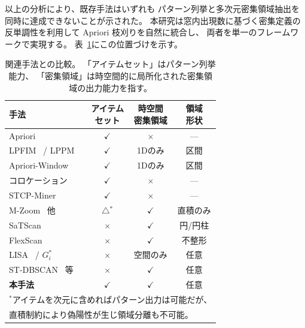 以上の分析により、既存手法はいずれも
パターン列挙と多次元密集領域抽出を同時に達成できないことが示された。
本研究は窓内出現数に基づく密集定義の反単調性を利用して
Apriori 枝刈りを自然に統合し、
両者を単一のフレームワークで実現する。
表~\ref{tab:related}にこの位置づけを示す。

\begin{table}[t]
\centering
\caption{関連手法との比較。
「アイテムセット」はパターン列挙能力、
「密集領域」は時空間的に局所化された密集領域の出力能力を指す。}
\label{tab:related}
\small
\begin{tabular}{lccc}
\toprule
手法 & \shortstack{アイテム\\セット} & \shortstack{時空間\\密集領域} & \shortstack{領域\\形状} \\
\midrule
Apriori~\cite{agrawal1994apriori}
                                          & $\checkmark$ & $\times$     & ---          \\
LPFIM~\cite{mahanta2005lpfim} / LPPM~\cite{fournierviger2021lppm}
                                          & $\checkmark$ & 1Dのみ      & 区間     \\
Apriori-Window~\cite{aprioriwindow}       & $\checkmark$ & 1Dのみ      & 区間     \\
コロケーション~\cite{shekhar2001colocation}
                                          & $\checkmark$ & $\times$     & ---          \\
STCP-Miner~\cite{qian2009stcolocation}   & $\checkmark$ & $\times$     & ---          \\
\midrule
M-Zoom~\cite{shin2018mzoom} 他           & $\triangle$$^*$     & $\checkmark$ & 直積のみ \\
SaTScan~\cite{kulldorff1997spatial}       & $\times$     & $\checkmark$ & 円/円柱 \\
FlexScan~\cite{tango2005flexscan}        & $\times$     & $\checkmark$ & 不整形    \\
LISA~\cite{anselin1995lisa}
  / $G_i^*$~\cite{ord1995getis}          & $\times$     & 空間のみ     & 任意         \\
ST-DBSCAN~\cite{birant2007stdbscan} 等   & $\times$   & $\checkmark$ & 任意    \\
\midrule
\textbf{本手法}                              & $\checkmark$ & $\checkmark$ & 任意    \\
\bottomrule
\multicolumn{4}{l}{\scriptsize $^*$アイテムを次元に含めればパターン出力は可能だが、} \\
\multicolumn{4}{l}{\scriptsize \hspace{1em}直積制約により偽陽性が生じ領域分離も不可能。}
\end{tabular}
\end{table}
